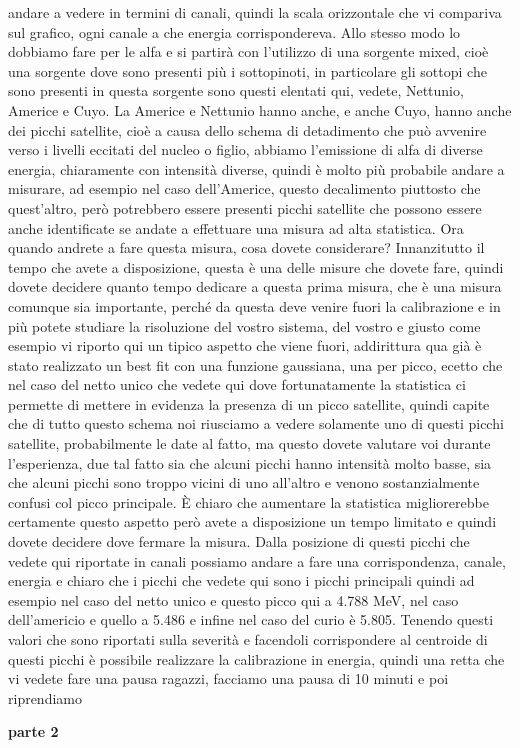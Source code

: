 {andare a vedere in termini di canali, quindi la scala orizzontale che vi compariva sul grafico, ogni canale a che energia corrispondereva. Allo stesso modo lo dobbiamo fare per le alfa e si partirà con l'utilizzo di una sorgente mixed, cioè una sorgente dove sono presenti più i sottopinoti, in particolare gli sottopi che sono presenti in questa sorgente sono questi elentati qui, vedete, Nettunio, Americe e Cuyo. La Americe e Nettunio hanno anche, e anche Cuyo, hanno anche dei picchi satellite, cioè a causa dello schema di detadimento che può avvenire verso i livelli eccitati del nucleo o figlio, abbiamo l'emissione di alfa di diverse energia, chiaramente con intensità diverse, quindi è molto più probabile andare a misurare, ad esempio nel caso dell'Americe, questo decalimento piuttosto che quest'altro, però potrebbero essere presenti picchi satellite che possono essere anche identificate se andate a effettuare una misura ad alta statistica. Ora quando andrete a fare questa misura, cosa dovete considerare? Innanzitutto il tempo che avete a disposizione, questa è una delle misure che dovete fare, quindi dovete decidere quanto tempo dedicare a questa prima misura, che è una misura comunque sia importante, perché da questa deve venire fuori la calibrazione e in più potete studiare la risoluzione del vostro sistema, del vostro e giusto come esempio vi riporto qui un tipico aspetto che viene fuori, addirittura qua già è stato realizzato un best fit con una funzione gaussiana, una per picco, ecetto che nel caso del netto unico che vedete qui dove fortunatamente la statistica ci permette di mettere in evidenza la presenza di un picco satellite, quindi capite che di tutto questo schema noi riusciamo a vedere solamente uno di questi picchi satellite, probabilmente le date al fatto, ma questo dovete valutare voi durante l'esperienza, due tal fatto sia che alcuni picchi hanno intensità molto basse, sia che alcuni picchi sono troppo vicini di uno all'altro e venono sostanzialmente confusi col picco principale. È chiaro che aumentare la statistica migliorerebbe certamente questo aspetto però avete a disposizione un tempo limitato e quindi dovete decidere dove fermare la misura. Dalla posizione di questi picchi che vedete qui riportate in canali possiamo andare a fare una corrispondenza, canale, energia e chiaro che i picchi che vedete qui sono i picchi principali quindi ad esempio nel caso del netto unico e questo picco qui a 4.788 MeV, nel caso dell'americio e quello a 5.486 e infine nel caso del curio è 5.805. Tenendo questi valori che sono riportati sulla severità e facendoli corrispondere al centroide di questi picchi è possibile realizzare la calibrazione in energia, quindi una retta che vi vedete fare una pausa ragazzi, facciamo una pausa di 10 minuti e poi riprendiamo

\textbf{parte 2}
}